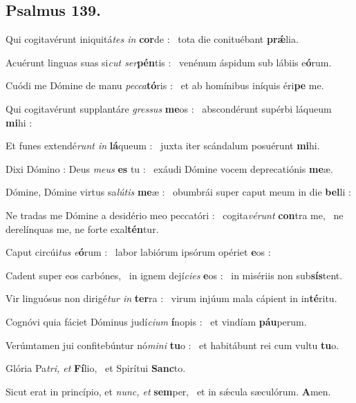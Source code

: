 \documentclass[12pt]{article} %
\def\noinitial{%
\gresetfirstlineaboveinitial{\textcolor{benred8}{\small \textsc{\textbf{}}}}{\textcolor{benred8}{\small \textsc{\textbf{}}}}
\setspaceafterinitial{0pt plus 0em minus 0em}%
\setspacebeforeinitial{0pt plus 0em minus 0em}%
\relax %
}
\newenvironment{psalmtext}{\leftskip 0.25in}{\vspace{1 mm}}
\let\oldgresixstar\gresixstar
\renewcommand{\gresixstar}{\textcolor{benred8}{\oldgresixstar}}
\let\oldgredagger\gredagger
\renewcommand{\gredagger}{\textcolor{benred8}{\oldgredagger}}
\begin{document}
\subsection*{Psalmus 139.}

{\noinitial
{}

}

\begin{psalmtext}
Qui cogitavérunt iniquitá\emph{tes in} \textbf{cor}de : \gresixstar\ tota die conituébant \textbf{prǽ}lia.

Acuérunt linguas suas si\emph{cut ser}\textbf{pén}tis : \gresixstar\ venénum áspidum sub lábiis e\textbf{ó}rum.

Cuódi me Dómine de manu \emph{pecca}\textbf{tó}ris : \gresixstar\ et ab homínibus iníquis éri\textbf{pe} me.

Qui cogitavérunt supplantáre \emph{gressus} \textbf{me}os : \gresixstar\ abscondérunt supérbi láqueum \textbf{mi}hi :

Et funes extendé\emph{runt in} \textbf{lá}queum : \gresixstar\ juxta iter scándalum posuérunt \textbf{mi}hi.

Dixi Dómino : Deus \emph{meus} \textbf{es} tu : \gresixstar\ exáudi Dómine vocem deprecatiónis \textbf{me}æ.

Dómine, Dómine virtus sa\emph{lútis} \textbf{me}æ : \gresixstar\ obumbrái super caput meum in die \textbf{bel}li :

Ne tradas me Dómine a desidério meo peccatóri : \gredagger\ cogita\emph{vérunt} \textbf{con}tra me, \gresixstar\ ne derelínquas me, ne forte exal\textbf{tén}tur.

Caput circúi\emph{tus e}\textbf{ó}rum : \gresixstar\ labor labiórum ipsórum opériet \textbf{e}os :

Cadent super eos carbónes, \gredagger\ in ignem dejí\emph{cies} \textbf{e}os : \gresixstar\ in misériis non sub\textbf{sís}tent.

Vir linguósus non dirigé\emph{tur in} \textbf{ter}ra : \gresixstar\ virum injúum mala cápient in in\textbf{té}ritu.

Cognóvi quia fáciet Dóminus judí\emph{cium} \textbf{í}nopis : \gresixstar\ et vindíam \textbf{páu}perum.

Verúmtamen jui confitebúntur nó\emph{mini} \textbf{tu}o : \gresixstar\ et habitábunt rei cum vultu \textbf{tu}o.

Glória Pa\emph{tri, et} \textbf{Fí}lio, \gresixstar\ et Spirítui \textbf{Sanc}to.

Sicut erat in princípio, et \emph{nunc, et} \textbf{sem}per, \gresixstar\ et in sǽcula sæculórum. \textbf{A}men.

\end{psalmtext}
\end{document}
